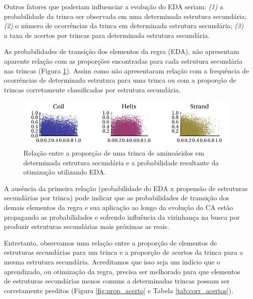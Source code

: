 Outros fatores que poderiam influenciar a evolução do EDA seriam: \textit{(1)} a probabilidade da trinca ser observada em uma determinada estrutura secundária; \textit{(2)} o número de ocorrências da trinca em determinada estrutura secundária; \textit{(3)} a taxa de acertos por trincas para determinada estrutura secundária. 


As probabilidades de transição dos elementos da regra (EDA), não apresentam aparente relação com as proporções encontradas para cada estrutura secundária nas trincas (Figura \ref{fig:relacao_prob_propss}). Assim como não apresentaram relação com a frequência de ocorrências de determinada estrutura para uma trinca ou com a proporção de trincas corretamente classificadas por estrutura secundária. 




\begin{figure}
  \centering
  \includegraphics[width=1\textwidth]{figures/relacao_prob_propss.pdf}
  \caption{Relação entre a proporção de uma trinca de aminoácidos em determinada estrutura secundária e a probabilidade resultante da otimização utilizando EDA.}
        \label{fig:relacao_prob_propss}
\end{figure}

A ausência da primeira relação (probabilidade do EDA x propensão de estruturas secundárias por trinca) pode indicar que as probabilidades de transição dos demais elementos da regra e sua aplicação ao longo da evolução do CA estão propagando as probabilidades e sofrendo influência da vizinhança na busca por produzir estruturas secundárias mais próximas as reais. 

Entretanto, observamos uma relação entre a proporção de elementos de estruturas secundárias para um trinca e a proporção de acertos da trinca para a mesma estrutura secundária. Acreditamos que isso seja um indício que o aprendizado, ou otimização da regra, precisa ser melhorado para que elementos de estruturas secundárias menos comuns a determinadas trincas possam ser corretamente preditos (Figura  \ref{fig:prop_acerto} e Tabela \ref{tab:corr_acertos}).  


